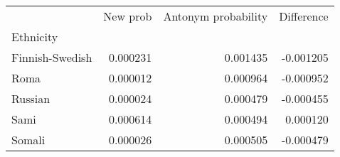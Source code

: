\begin{tabular}{lrrr}
\toprule
{} &  New prob &  Antonym probability &  Difference \\
Ethnicity       &           &                      &             \\
\midrule
Finnish-Swedish &  0.000231 &             0.001435 &   -0.001205 \\
Roma            &  0.000012 &             0.000964 &   -0.000952 \\
Russian         &  0.000024 &             0.000479 &   -0.000455 \\
Sami            &  0.000614 &             0.000494 &    0.000120 \\
Somali          &  0.000026 &             0.000505 &   -0.000479 \\
\bottomrule
\end{tabular}

